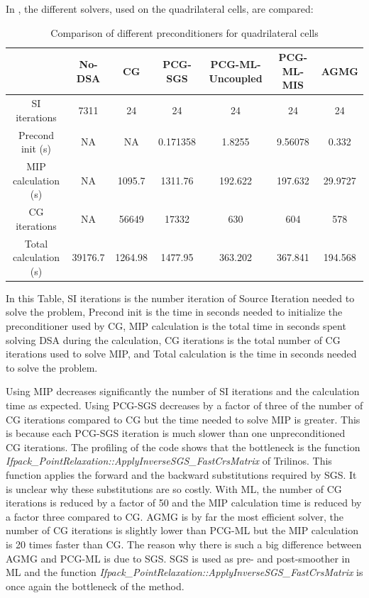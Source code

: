 In , the different solvers, used on the
quadrilateral cells, are compared:
\begin{table}[H]
  \begin{center}
    \caption{Comparison of different preconditioners for quadrilateral cells}
    \begin{tabular}{|c|c|c|c|c|c|c|}
      \hline
      & No-DSA & CG & PCG-SGS & PCG-ML-Uncoupled & PCG-ML-MIS & AGMG \\
      \hline
      SI iterations   & 7311    & 24      & 24       & 24      & 24      & 24 \\
   Precond init (s)   & NA      & NA      & 0.171358 & 1.8255  & 9.56078 & 0.332 \\
MIP calculation (s)   & NA      & 1095.7  & 1311.76  & 192.622 & 197.632 & 29.9727 \\
      CG iterations   & NA      & 56649   & 17332    & 630     & 604     & 578 \\
Total calculation (s) & 39176.7 & 1264.98 & 1477.95  & 363.202 & 367.841 &
      194.568 \\
      \hline
    \end{tabular}
    \label{comparison_homog_quad}
  \end{center}
\end{table}
In this Table, SI iterations is the number iteration of Source Iteration
needed to solve the problem, Precond init is the time in seconds needed to
initialize the preconditioner used by CG, MIP calculation is the total time in
seconds spent solving DSA during the calculation, CG iterations is the total number 
of CG iterations used to solve MIP, and Total calculation is the time in
seconds needed to solve the problem.

Using MIP decreases significantly the number of SI iterations and the
calculation time as expected. Using PCG-SGS decreases by a factor of three of
the number of CG iterations compared to CG but the time needed to solve MIP is
greater. This is because each PCG-SGS iteration is much slower than one
unpreconditioned CG iterations. The profiling of the code shows that the
bottleneck is the function 
\emph{Ifpack\_PointRelaxation::ApplyInverseSGS\_FastCrsMatrix} of Trilinos. This
function applies the forward and the backward substitutions required by SGS.
It is unclear why these substitutions are so costly. With ML, the number of CG
iterations is reduced by a factor of 50 and the MIP calculation time is
reduced by a factor three compared to CG. AGMG is by far the most efficient
solver, the number of CG iterations is slightly lower than PCG-ML but the MIP
calculation is 20 times faster than CG. The reason why there is such a big
difference between AGMG and PCG-ML is due to SGS. SGS is used as pre- and
post-smoother in ML and the function
\emph{Ifpack\_PointRelaxation::ApplyInverseSGS\_FastCrsMatrix} is once again the
bottleneck of the method.

